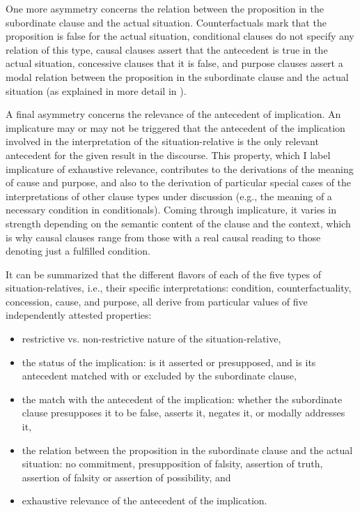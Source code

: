 \documentclass[output=paper,
colorlinks,
citecolor=brown,
newtxmath
]{langscibook}
\begin{document}
One more asymmetry concerns the relation between the proposition in the subordinate clause and the actual situation. Counterfactuals mark that the proposition is false for the actual situation, conditional clauses do not specify any relation of this type, causal clauses assert that the antecedent is true in the actual situation, concessive clauses that it is false, and purpose clauses assert a modal relation between the proposition in the subordinate clause and the actual situation (as explained in more detail in ).

A final asymmetry concerns the relevance of the antecedent of implication. An implicature may or may not be triggered that the antecedent of the implication involved in the interpretation of the situation-relative is the only relevant antecedent for the given result in the discourse.  This property, which I label implicature of exhaustive relevance, contributes to the derivations of the meaning of cause and purpose, and also to the derivation of particular special cases of the interpretations of other clause types under discussion (e.g., the meaning of a necessary condition in conditionals). Coming through implicature, it varies in strength depending on the semantic content of the clause and the context, which is why causal clauses range from those with a real causal reading to those denoting just a fulfilled condition.

It can be summarized that the different flavors of each of the five types of situation-relatives, i.e., their specific interpretations: condition, counterfactuality, concession, cause, and purpose, all derive from particular values of five independently attested properties:

\begin{itemize}
 \setlength{\itemsep}{0pt}
\item restrictive vs. non-restrictive nature of the situation-relative,
\item the status of the implication: is it asserted or presupposed, and is its antecedent matched with or excluded by the subordinate clause,
\item the match with the antecedent of the implication: whether the subordinate clause presupposes it to be false, asserts it, negates it, or modally addresses it,
\item the relation between the proposition in the subordinate clause and the actual situation: no commitment, presupposition of falsity, assertion of truth, assertion of falsity or assertion of possibility, and
\item exhaustive relevance of the antecedent of the implication.
\end{itemize}
\end{document}
